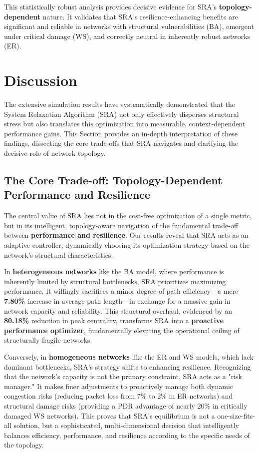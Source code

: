 \documentclass[journal]{IEEEtran}
\begin{document}
This statistically robust analysis provides decisive evidence for SRA's \textbf{topology-dependent} nature. It validates that SRA's resilience-enhancing benefits are significant and reliable in networks with structural vulnerabilities (BA), emergent under critical damage (WS), and correctly neutral in inherently robust networks (ER).

\section{Discussion}
\label{sec:discussion}

The extensive simulation results have systematically demonstrated that the System Relaxation Algorithm (SRA) not only effectively disperses structural stress but also translates this optimization into measurable, context-dependent performance gains. This Section provides an in-depth interpretation of these findings, dissecting the core trade-offs that SRA navigates and clarifying the decisive role of network topology.

\subsection{The Core Trade-off: Topology-Dependent Performance and Resilience}

The central value of SRA lies not in the cost-free optimization of a single metric, but in its intelligent, topology-aware navigation of the fundamental trade-off between \textbf{performance and resilience}. Our results reveal that SRA acts as an adaptive controller, dynamically choosing its optimization strategy based on the network's structural characteristics.

In \textbf{heterogeneous networks} like the BA model, where performance is inherently limited by structural bottlenecks, SRA prioritizes maximizing performance. It willingly sacrifices a minor degree of path efficiency---a mere \textbf{7.80\%} increase in average path length---in exchange for a massive gain in network capacity and reliability. This structural overhaul, evidenced by an \textbf{80.18\%} reduction in peak centrality, transforms SRA into a \textbf{proactive performance optimizer}, fundamentally elevating the operational ceiling of structurally fragile networks.

Conversely, in \textbf{homogeneous networks} like the ER and WS models, which lack dominant bottlenecks, SRA's strategy shifts to enhancing resilience. Recognizing that the network's capacity is not the primary constraint, SRA acts as a "risk manager." It makes finer adjustments to proactively manage both dynamic congestion risks (reducing packet loss from 7\% to 2\% in ER networks) and structural damage risks (providing a PDR advantage of nearly 20\% in critically damaged WS networks). This proves that SRA's equilibrium is not a one-size-fits-all solution, but a sophisticated, multi-dimensional decision that intelligently balances efficiency, performance, and resilience according to the specific needs of the topology.
\end{document}
